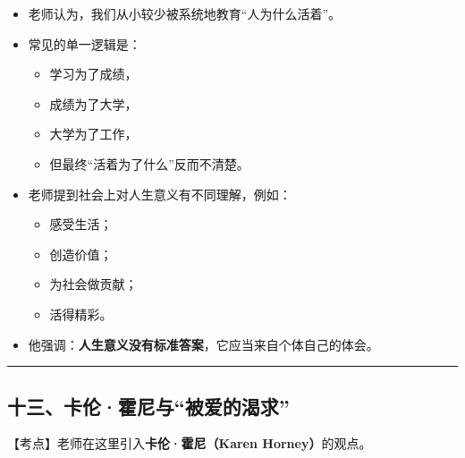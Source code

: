 \documentclass[
  chinese,
  9pt,
  a4paper,
]{ctexart}
\providecommand{\tightlist}{%
  \setlength{\itemsep}{0pt}\setlength{\parskip}{0pt}}
\begin{document}
\begin{itemize}
\item
  老师认为，我们从小较少被系统地教育``人为什么活着''。
\item
  常见的单一逻辑是：

  \begin{itemize}
  \tightlist
  \item
    学习为了成绩，
  \item
    成绩为了大学，
  \item
    大学为了工作，
  \item
    但最终``活着为了什么''反而不清楚。
  \end{itemize}
\item
  老师提到社会上对人生意义有不同理解，例如：

  \begin{itemize}
  \tightlist
  \item
    感受生活；
  \item
    创造价值；
  \item
    为社会做贡献；
  \item
    活得精彩。
  \end{itemize}
\item
  他强调：\textbf{人生意义没有标准答案}，它应当来自个体自己的体会。
\end{itemize}

\begin{center}\rule{0.5\linewidth}{0.5pt}\end{center}

\subsection{十三、卡伦·霍尼与``被爱的渴求''}\label{ux5341ux4e09ux5361ux4f26ux970dux5c3cux4e0eux88abux7231ux7684ux6e34ux6c42}

【考点】老师在这里引入\textbf{卡伦·霍尼（Karen Horney）}的观点。
\end{document}
